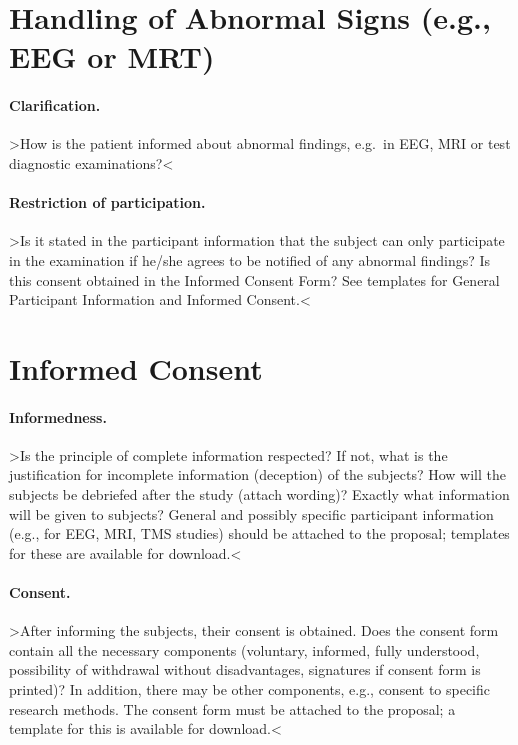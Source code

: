 \documentclass[11pt,twoside,a4paper]{article}
\begin{document}
\section{Handling of Abnormal Signs (e.g., EEG or MRT)}

\paragraph{Clarification.}

>How is the patient informed about abnormal findings, e.g.~in EEG, MRI or test diagnostic examinations?<

\paragraph{Restriction of participation.}

>Is it stated in the participant information that the subject can only participate in the examination if he/she agrees to be notified of any abnormal findings?
Is this consent obtained in the Informed Consent Form?
See templates for General Participant Information and Informed Consent.<

\section{Informed Consent}

\paragraph{Informedness.}

>Is the principle of complete information respected?
If not, what is the justification for incomplete information (deception) of the subjects?
How will the subjects be debriefed after the study (attach wording)?
Exactly what information will be given to subjects?
General and possibly specific participant information (e.g., for EEG, MRI, TMS studies) should be attached to the proposal; templates for these are available for download.<

\paragraph{Consent.}

>After informing the subjects, their consent is obtained.
Does the consent form contain all the necessary components (voluntary, informed, fully understood, possibility of withdrawal without disadvantages, signatures if consent form is printed)?
In addition, there may be other components, e.g., consent to specific research methods.
The consent form must be attached to the proposal; a template for this is available for download.<
\end{document}
